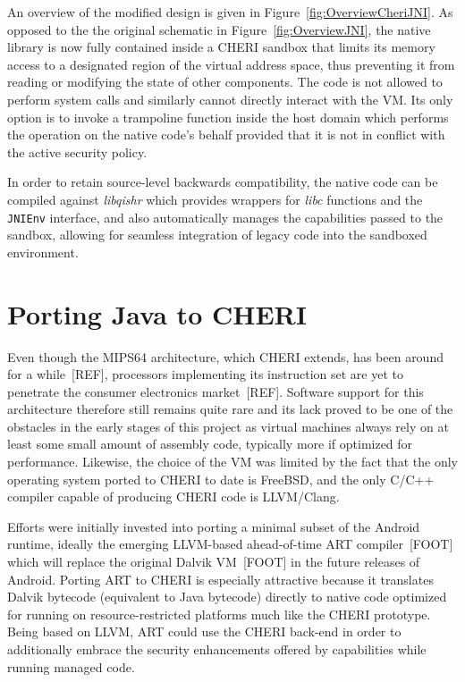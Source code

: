 \documentclass[a4paper,12pt,twoside,openright]{report}
\newcommand{\tool}[1]{\emph{#1}}
\newcommand{\lib}[1]{\tool{lib#1}}
\begin{document}
An overview of the modified design is given in Figure~\ref{fig:OverviewCheriJNI}. As opposed to the the original schematic in Figure~\ref{fig:OverviewJNI}, the native library is now fully contained inside a CHERI sandbox that limits its memory access to a designated region of the virtual address space, thus preventing it from reading or modifying the state of other components. The code is not allowed to perform system calls and similarly cannot directly interact with the VM. Its only option is to invoke a trampoline function inside the host domain which performs the operation on the native code's behalf provided that it is not in conflict with the active security policy.

In order to retain source-level backwards compatibility, the native code can be compiled against \lib{qishr} which provides wrappers for \lib{c} functions and the \texttt{JNIEnv} interface, and also automatically manages the capabilities passed to the sandbox, allowing for seamless integration of legacy code into the sandboxed environment.

\section{Porting Java to CHERI}

Even though the MIPS64 architecture, which CHERI extends, has been around for a while~[REF], processors implementing its instruction set are yet to penetrate the consumer electronics market~[REF]. Software support for this architecture therefore still remains quite rare and its lack proved to be one of the obstacles in the early stages of this project as virtual machines always rely on at least some small amount of assembly code, typically more if optimized for performance. Likewise, the choice of the VM was limited by the fact that the only operating system ported to CHERI to date is FreeBSD, and the only C/C++ compiler capable of producing CHERI code is LLVM/Clang. 

Efforts were initially invested into porting a minimal subset of the Android runtime, ideally the emerging LLVM-based ahead-of-time ART compiler~[FOOT] which will replace the original Dalvik VM~[FOOT] in the future releases of Android. Porting ART to CHERI is especially attractive because it translates Dalvik bytecode (equivalent to Java bytecode) directly to native code optimized for running on resource-restricted platforms much like the CHERI prototype. Being based on LLVM, ART could use the CHERI back-end in order to additionally embrace the security enhancements offered by capabilities while running managed code.
\end{document}
